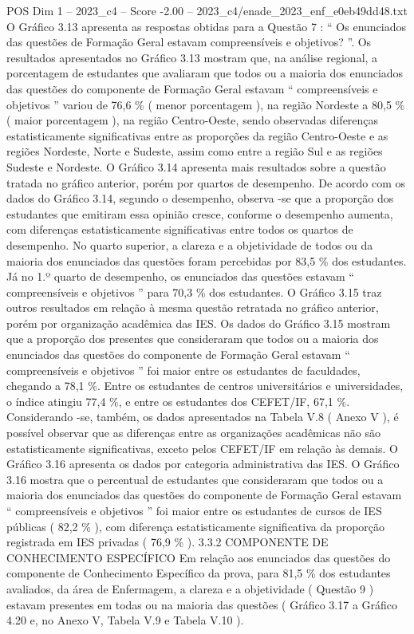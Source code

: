 \begin{textsample}{POS Dim 1 – 2023\_c4 – Score -2.00 – 2023\_c4/enade\_2023\_enf\_e0eb49dd48.txt}
O Gráfico 3.13 apresenta as respostas obtidas para a Questão 7 : “ Os enunciados das questões de Formação Geral estavam compreensíveis e objetivos? ”.
Os resultados apresentados no Gráfico 3.13 mostram que, na análise regional, a porcentagem de estudantes que avaliaram que todos ou a maioria dos enunciados das questões do componente de Formação Geral estavam “ compreensíveis e objetivos ” variou de 76,6 \% ( menor porcentagem ), na região Nordeste a 80,5 \% ( maior porcentagem ), na região Centro-Oeste, sendo observadas diferenças estatisticamente significativas entre as proporções da região Centro-Oeste e as regiões Nordeste, Norte e Sudeste, assim como entre a região Sul e as regiões Sudeste e Nordeste.
O Gráfico 3.14 apresenta mais resultados sobre a questão tratada no gráfico anterior, porém por quartos de desempenho.
De acordo com os dados do Gráfico 3.14, segundo o desempenho, observa -se que a proporção dos estudantes que emitiram essa opinião cresce, conforme o desempenho aumenta, com diferenças estatisticamente significativas entre todos os quartos de desempenho.
No quarto superior, a clareza e a objetividade de todos ou da maioria dos enunciados das questões foram percebidas por 83,5 \% dos estudantes.
Já no 1.º quarto de desempenho, os enunciados das questões estavam “ compreensíveis e objetivos ” para 70,3 \% dos estudantes.
O Gráfico 3.15 traz outros resultados em relação à mesma questão retratada no gráfico anterior, porém por organização acadêmica das IES.
Os dados do Gráfico 3.15 mostram que a proporção dos presentes que consideraram que todos ou a maioria dos enunciados das questões do componente de Formação Geral estavam “ compreensíveis e objetivos ” foi maior entre os estudantes de faculdades, chegando a 78,1 \%.
Entre os estudantes de centros universitários e universidades, o índice atingiu 77,4 \%, e entre os estudantes dos CEFET/IF, 67,1 \%.
Considerando -se, também, os dados apresentados na Tabela V.8 ( Anexo V ), é possível observar que as diferenças entre as organizações acadêmicas não são estatisticamente significativas, exceto pelos CEFET/IF em relação às demais.
O Gráfico 3.16 apresenta os dados por categoria administrativa das IES.
O Gráfico 3.16 mostra que o percentual de estudantes que consideraram que todos ou a maioria dos enunciados das questões do componente de Formação Geral estavam “ compreensíveis e objetivos ” foi maior entre os estudantes de cursos de IES públicas ( 82,2 \% ), com diferença estatisticamente significativa da proporção registrada em IES privadas ( 76,9 \% ). 3.3.2 COMPONENTE DE CONHECIMENTO ESPECÍFICO Em relação aos enunciados das questões do componente de Conhecimento Específico da prova, para 81,5 \% dos estudantes avaliados, da área de Enfermagem, a clareza e a objetividade ( Questão 9 ) estavam presentes em todas ou na maioria das questões ( Gráfico 3.17 a Gráfico 4.20 e, no Anexo V, Tabela V.9 e Tabela V.10 ).

\end{textsample}

